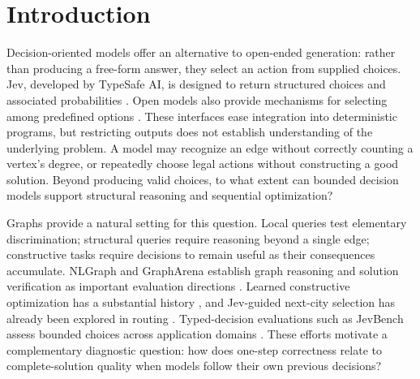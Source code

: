 \begin{abstract}
Can valid local decisions compose into good graph solutions? GraphDecide
evaluates Jev and open decision-oriented models on six exact graph tasks and
four irreversible construction tasks. Small graphs permit independently
checked labels, exact optima and own-history error analysis. Twelve
configurations share 960 instances: ten direct-decision configurations and
two GPT upper reference points with different reasoning budgets. Jev achieves
100\% adjacency accuracy but 61.43\% degree accuracy and 58.75\% distance
accuracy. Its mean TSP gap is 45.85 versus 100.90 for bounded Qwen3.5-27B;
on influence maximization their gaps are 0.600 and 0.425. Jev has smaller
construction gaps than added Qwen3.8-27B and Qwen2.5-72B configurations,
without establishing general parameter equivalence. A separate 952-instance
confirmation covers the original four configurations. Classical references,
presentation controls and probability audits distinguish valid actions from
correct decisions and competitive solutions. The benchmark characterizes
task-dependent capabilities, not a universal ranking or a fitted size limit.
\end{abstract}

\section{Introduction}
Decision-oriented models offer an alternative to open-ended generation:
rather than producing a free-form answer, they select an action from supplied
choices. Jev, developed by TypeSafe AI, is designed to return structured
choices and associated probabilities \cite{almeida2026jev}.
Open models also provide mechanisms for selecting among predefined options
\cite{semif2026,decider2026model,kev2026model,laya2026}.
These interfaces ease integration into deterministic programs, but restricting
outputs does not establish understanding of the underlying problem.
A model may recognize an edge without correctly counting a vertex's degree,
or repeatedly choose legal actions without constructing a good solution.
Beyond producing valid choices, to what extent can bounded decision models
support structural reasoning and sequential optimization?

Graphs provide a natural setting for this question. Local queries test
elementary discrimination; structural queries require reasoning beyond a
single edge; constructive tasks require decisions to remain useful as their
consequences accumulate. NLGraph and GraphArena establish graph reasoning
and solution verification as important evaluation directions
\cite{wang2023nlgraph,tang2025grapharena}.
Learned constructive optimization has a substantial history
\cite{khalil2017learning,kool2019attention}, and Jev-guided next-city
selection has already been explored in routing \cite{worldtour2026}.
Typed-decision evaluations such as JevBench assess bounded choices across
application domains \cite{jevbench2026}. These efforts motivate a
complementary diagnostic question: how does one-step correctness relate to
complete-solution quality when models follow their own previous decisions?


